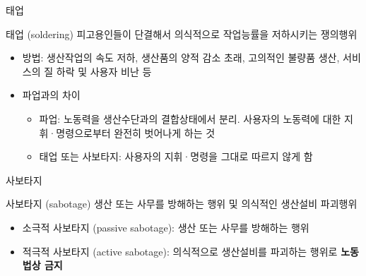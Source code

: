 \documentclass[aspectratio=169,xcolor=dvipsnames,handout]{beamer}
\begin{document}
\begin{frame}{태업}
    \begin{block}{태업 (soldering)} 
        피고용인들이 단결해서 의식적으로 작업능률을 저하시키는 쟁의행위
    \end{block}
    \begin{itemize}[<+->]
        \item 방법: 생산작업의 속도 저하, 생산품의 양적 감소 초래, 고의적인 불량품 생산, 서비스의 질 하락 및 사용자 비난 등
        \item 파업과의 차이
        \begin{itemize}[<+->]
            \item 파업: 노동력을 생산수단과의 결합상태에서 분리. 사용자의 노동력에 대한 지휘·명령으로부터 완전히 벗어나게 하는 것
            \item 태업 또는 사보타지: 사용자의 지휘·명령을 그대로 따르지 않게 함
        \end{itemize}
    \end{itemize}
\end{frame}

\begin{frame}{사보타지}
    \framebreak\relax
    \begin{block}{사보타지 (sabotage)}
        생산 또는 사무를 방해하는 행위 및 의식적인 생산설비 파괴행위
    \end{block}
        \begin{itemize}[<+->]
            \item 소극적 사보타지 (passive sabotage): 생산 또는 사무를 방해하는 행위
            \item 적극적 사보타지 (active sabotage): 의식적으로 생산설비를 파괴하는 행위로 \textbf{노동법상 금지}
        \end{itemize}
\end{frame}
\end{document}
